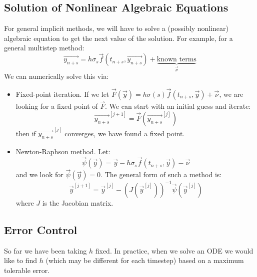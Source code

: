 \documentclass[../Main.tex]{subfiles}
\begin{document}
\subsection{Solution of Nonlinear Algebraic Equations}
For general implicit methods, we will have to solve a (possibly nonlinear) algebraic equation to get the next value of the solution. For example, for a general multistep method:
\begin{equation*}
    \vec{y_{n + s}} = h\sigma_s \vec{f}(t_{n + s}, \vec{y_{n + s}}) + \underbrace{\text{known terms}}_{\vec{\nu}}
\end{equation*}
We can numerically solve this via:
\begin{itemize}
    \item Fixed-point iteration. If we let $\vec{F}(\vec{y}) = h\sigma(s) \vec{f}(t_{n + s}, \vec{y}) + \vec{\nu}$, we are looking for a fixed point of $\vec{F}$. We can start with an initial guess and iterate:
        \begin{equation*}
            \vec{y_{n+s}}^{[j + 1]} = \vec{F}(\vec{y_{n + s}}^{[j]})
        \end{equation*}
        then if $\vec{y_{n + s}}^{[j]}$ converges, we have found a fixed point.
    \item Newton-Raphson method. Let:
        \begin{equation*}
            \vec{\psi}(\vec{y}) = \vec{y} - h\sigma_s \vec{f}(t_{n + s}, \vec{y}) - \vec{\nu}
        \end{equation*}    
        and we look for $\vec{\psi}(\vec{y}) = 0$. The general form of such a method is:
        \begin{equation*}
            \vec{y}^{[j + 1]} = \vec{y}^{[j]} - \left(J(\vec{y}^{[j]})\right)^{-1} \vec{\psi}(\vec{y}^{[j]})
        \end{equation*}
        where $J$ is the Jacobian matrix.
\end{itemize}
\subsection{Error Control}
So far we have been taking $h$ fixed. In practice, when we solve an ODE we would like to find $h$ (which may be different for each timestep) based on a maximum tolerable error.
\end{document}
